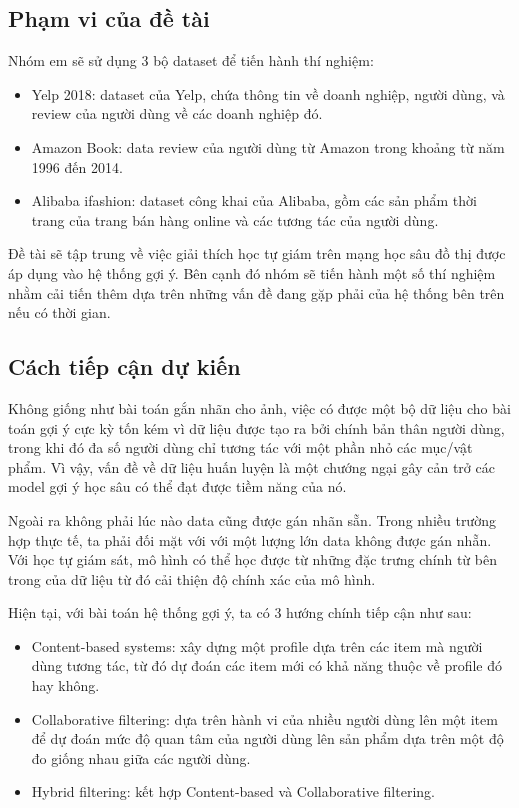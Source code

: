 \documentclass{article}[14pt]
\begin{document}
    \subsection{Phạm vi của đề tài}
    
    Nhóm em sẽ sử dụng 3 bộ dataset để tiến hành thí nghiệm:
    \begin{itemize}
        \item Yelp 2018: dataset của Yelp, chứa thông tin về doanh nghiệp, người dùng, và review của người dùng về các doanh nghiệp đó.
        \item Amazon Book: data review của người dùng từ Amazon trong khoảng từ năm 1996 đến 2014.
        \item Alibaba ifashion: dataset công khai của Alibaba, gồm các sản phẩm thời trang của trang bán hàng online và các tương tác của người dùng.
    \end{itemize}

    Đề tài sẽ tập trung về việc giải thích học tự giám trên mạng học sâu đồ thị được áp dụng vào hệ thống gợi ý. Bên cạnh đó nhóm sẽ tiến hành một số thí nghiệm nhằm cải tiến thêm dựa trên những vấn đề đang gặp phải của hệ thống bên trên nếu có thời gian.
    
    \subsection{Cách tiếp cận dự kiến}
    
    Không giống như bài toán gắn nhãn cho ảnh, việc có được một bộ dữ liệu cho bài toán gợi ý cực kỳ tốn kém vì dữ liệu được tạo ra bởi chính bản thân người dùng, trong khi đó đa số người dùng chỉ tương tác với một phần nhỏ các mục/vật phẩm. Vì vậy, vấn đề về dữ liệu huấn luyện là một chướng ngại gây cản trở các model gợi ý học sâu có thể đạt được tiềm năng của nó. 

    Ngoài ra không phải lúc nào data cũng được gán nhãn sẵn. Trong nhiều trường hợp thực tế, ta phải đối mặt với với một lượng lớn data không được gán nhẵn. Với học tự giám sát, mô hình có thể học được từ những đặc trưng chính từ bên trong của dữ liệu từ đó cải thiện độ chính xác của mô hình.
    
    Hiện tại, với bài toán hệ thống gợi ý, ta có 3 hướng \cite{soa} chính tiếp cận như sau:
    \begin{itemize}[leftmargin=10mm]
        \item Content-based systems: xây dựng một profile dựa trên các item mà người dùng tương tác, từ đó dự đoán các item mới có khả năng thuộc về profile đó hay không.
        \item Collaborative filtering: dựa trên hành vi của nhiều người dùng lên một item để dự đoán mức độ quan tâm của người dùng lên sản phẩm dựa trên một độ đo giống nhau giữa các người dùng.
        \item Hybrid filtering: kết hợp Content-based và Collaborative filtering.
    \end{itemize}
\end{document}
